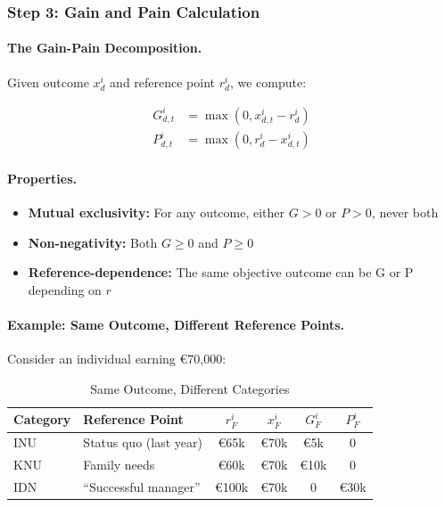 \subsubsection{Step 3: Gain and Pain Calculation}

\paragraph{The Gain-Pain Decomposition.}
Given outcome $x^i_d$ and reference point $r^i_d$, we compute:

\begin{definition}
\label{def:gain-pain-calc}
\begin{align}
G^i_{d,t} &= \max(0, x^i_{d,t} - r^i_d) \\
P^i_{d,t} &= \max(0, r^i_d - x^i_{d,t})
\end{align}
\end{definition}

\paragraph{Properties.}
\begin{itemize}
\item \textbf{Mutual exclusivity:} For any outcome, either $G > 0$ or $P > 0$, never both
\item \textbf{Non-negativity:} Both $G \geq 0$ and $P \geq 0$
\item \textbf{Reference-dependence:} The same objective outcome can be G or P depending on $r$
\end{itemize}

\paragraph{Example: Same Outcome, Different Reference Points.}
Consider an individual earning \euro{70,000}:

\begin{table}[htbp]
\centering
\caption{Same Outcome, Different Categories}
\label{tab:same-outcome}
\renewcommand{\arraystretch}{1.3}
\begin{tabular}{@{}llcccc@{}}
\toprule
\textbf{Category} & \textbf{Reference Point} & $r^i_F$ & $x^i_F$ & $G^i_F$ & $P^i_F$ \\
\midrule
INU & Status quo (last year) & \euro{65k} & \euro{70k} & \euro{5k} & 0 \\
KNU & Family needs & \euro{60k} & \euro{70k} & \euro{10k} & 0 \\
IDN & ``Successful manager'' & \euro{100k} & \euro{70k} & 0 & \euro{30k} \\
\bottomrule
\end{tabular}
\end{table}

